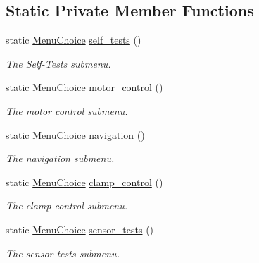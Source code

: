 \subsection*{Static Private Member Functions}
\begin{DoxyCompactItemize}
\item 
static \hyperlink{namespaceIDP_ac1d3c3b62448912be4da9f2728f2af99}{MenuChoice} \hyperlink{classIDP_1_1Menu_aebca2af9fb1ec279145eaeb3fd324491}{self\_\-tests} ()
\begin{DoxyCompactList}\small\item\em The Self-\/Tests submenu. \item\end{DoxyCompactList}\item 
static \hyperlink{namespaceIDP_ac1d3c3b62448912be4da9f2728f2af99}{MenuChoice} \hyperlink{classIDP_1_1Menu_a06ddcaf58c80fbe0d58e1633a7251e21}{motor\_\-control} ()
\begin{DoxyCompactList}\small\item\em The motor control submenu. \item\end{DoxyCompactList}\item 
static \hyperlink{namespaceIDP_ac1d3c3b62448912be4da9f2728f2af99}{MenuChoice} \hyperlink{classIDP_1_1Menu_a1ab505975b4b0984e32226adc62235f3}{navigation} ()
\begin{DoxyCompactList}\small\item\em The navigation submenu. \item\end{DoxyCompactList}\item 
static \hyperlink{namespaceIDP_ac1d3c3b62448912be4da9f2728f2af99}{MenuChoice} \hyperlink{classIDP_1_1Menu_a4fdf316988d3e78a39ded863001b92a9}{clamp\_\-control} ()
\begin{DoxyCompactList}\small\item\em The clamp control submenu. \item\end{DoxyCompactList}\item 
static \hyperlink{namespaceIDP_ac1d3c3b62448912be4da9f2728f2af99}{MenuChoice} \hyperlink{classIDP_1_1Menu_a1d459fa26899328e58cc13aae1e0c37e}{sensor\_\-tests} ()
\begin{DoxyCompactList}\small\item\em The sensor tests submenu. \item\end{DoxyCompactList}\item 

\end{DoxyCompactItemize}
